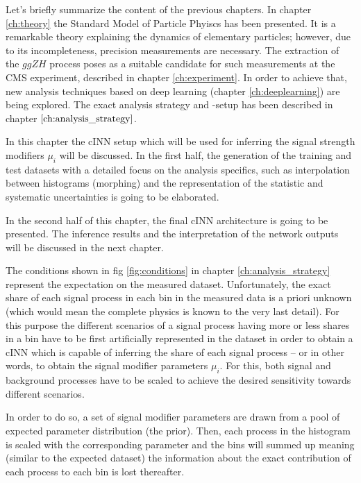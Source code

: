 
Let's briefly summarize the content of the previous chapters. In chapter \ref{ch:theory} the Standard Model of Particle Phyiscs has been presented. It is a remarkable theory explaining the dynamics of elementary particles; however, due to its incompleteness, precision measurements are necessary. The extraction of the $ggZH$ process poses as a suitable candidate for such measurements at the CMS experiment, described in chapter \ref{ch:experiment}. In order to achieve that, new analysis techniques based on deep learning (chapter \ref{ch:deeplearning}) are being explored. The exact analysis strategy and -setup has been described in chapter $\ref{ch:analysis_strategy}$.

In this chapter the cINN setup which will be used for inferring the signal strength modifiers $\mu_i$ will be discussed. In the first half, the generation of the training and test datasets with a detailed focus on the analysis specifics, such as interpolation between histograms (morphing) and the representation of the statistic and systematic uncertainties is going to be elaborated.

In the second half of this chapter, the final cINN architecture is going to be presented. The inference results and the interpretation of the network outputs will be discussed in the next chapter.


The conditions shown in fig \ref{fig:conditions} in chapter \ref{ch:analysis_strategy} represent the expectation on the measured dataset. Unfortunately, the exact share of each signal process in each bin in the measured data is a priori unknown (which would mean the complete physics is known to the very last detail). For this purpose the different scenarios of a signal process having more or less shares in a bin have to be first artificially represented in the dataset in order to obtain a cINN which is capable of inferring the share of each signal process -- or in other words, to obtain the signal modifier parameters $\mu_i$. For this, both signal and background processes have to be scaled to achieve the desired sensitivity towards different scenarios.


In order to do so, a set of signal modifier parameters are drawn from a pool of expected parameter distribution (the prior). Then, each process in the histogram is scaled with the corresponding parameter and the bins will summed up meaning (similar to the expected dataset) the information about the exact contribution of each process to each bin is lost thereafter.

